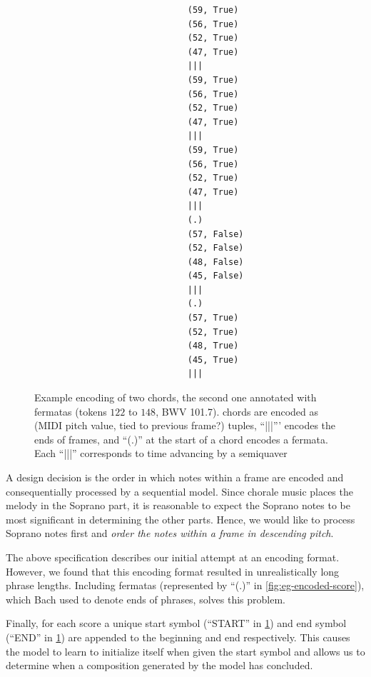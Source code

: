 \begin{figure}[p]
  \centering
  \begin{verbatim}
                              (59, True)
                              (56, True)
                              (52, True)
                              (47, True)
                              |||
                              (59, True)
                              (56, True)
                              (52, True)
                              (47, True)
                              |||
                              (59, True)
                              (56, True)
                              (52, True)
                              (47, True)
                              |||
                              (.)
                              (57, False)
                              (52, False)
                              (48, False)
                              (45, False)
                              |||
                              (.)
                              (57, True)
                              (52, True)
                              (48, True)
                              (45, True)
                              |||
  \end{verbatim}
  \caption{Example encoding of two chords, the second one annotated with fermatas (tokens $122$ to $148$, BWV 101.7).
  chords are encoded as (MIDI pitch value, tied to previous frame?) tuples,
  ``|||''' encodes the ends of frames, and ``(.)'' at the start of a chord
  encodes a fermata. Each ``|||'' corresponds to time advancing by a semiquaver}
  \label{fig:eg-encoded-score}
\end{figure}

A design decision is the order in which notes within a frame are encoded and
consequentially processed by a sequential model. Since chorale music places the
melody in the Soprano part, it is reasonable to expect the Soprano notes to be
most significant in determining the other parts. Hence, we would like to process
Soprano notes first and \emph{order the notes within a frame in descending pitch}.

The above specification describes our initial attempt at an encoding format.
However, we found that this encoding format resulted in unrealistically long
phrase lengths. Including fermatas (represented by ``(.)'' in
\vref{fig:eg-encoded-score}), which Bach used to denote ends of phrases, solves
this problem.

Finally, for each score a unique start symbol (``START'' in \cref{fig:eg-encoded-score})
and end symbol (``END'' in \cref{fig:eg-encoded-score}) are appended to the beginning and
end respectively. This causes the model to learn to initialize itself when
given the start symbol and allows us to determine when a composition generated
by the model has concluded.

